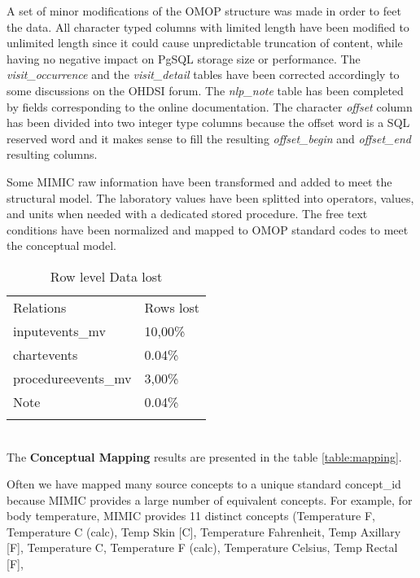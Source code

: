 A set of minor modifications of the OMOP structure was made in order to feet
the data. All character typed columns with limited length have been modified to
unlimited length since it could cause unpredictable truncation of content,
while having no negative impact on PgSQL storage size or performance. The
\textit{visit\_occurrence} and the \textit{visit\_detail} tables have been
corrected accordingly to some discussions on the OHDSI forum. The
\textit{nlp\_note} table has been completed by fields corresponding to the
online documentation. The character \textit{offset} column has been divided
into two integer type columns because the offset word is a SQL reserved word
and it makes sense to fill the resulting \textit{offset\_begin} and
\textit{offset\_end} resulting columns.

%
%
Some MIMIC raw information have been transformed and added to meet the
structural model. The laboratory values have been splitted into operators,
values, and units when needed with a dedicated stored procedure. The free text
conditions have been normalized and mapped to OMOP standard codes to meet the
conceptual model.

\begin{table*}[t]
\caption{Row level Data lost}{
\begin{tabular}{@{}ll@{}}\toprule
Relations           & Rows lost        \\\colrule
inputevents\_mv     & 10,00\%          \\
chartevents         & 0.04\%           \\
procedureevents\_mv & 3,00\%           \\
Note                & 0.04\%           \\\botrule
\end{tabular}}
\label{table:lostrows}
\end{table*}

~
\\


The \textbf{Conceptual Mapping} results are presented in the table
\ref{table:mapping}. 

Often we have mapped many source concepts to a unique standard concept\_id
because MIMIC provides a large number of equivalent concepts. For example, for
body temperature, MIMIC provides 11 distinct concepts (Temperature F,
Temperature C (calc), Temp Skin [C], Temperature Fahrenheit, Temp Axillary [F],
Temperature C, Temperature F (calc), Temperature Celsius, Temp Rectal [F], 

